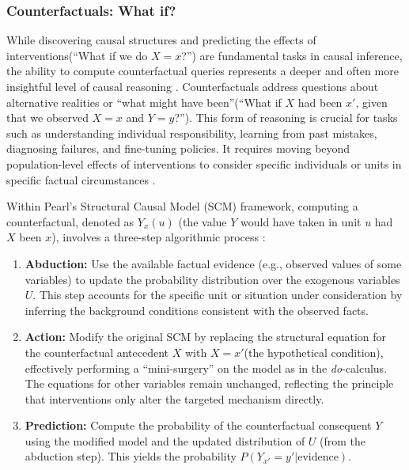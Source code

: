 {\newpage

\subsubsection{Counterfactuals: What if?}
\label{subsec:counterfactuals}

While discovering causal structures and predicting the effects of interventions(``What if we do $X=x$?'') are fundamental tasks in causal inference, the ability to compute counterfactual queries represents a deeper and often more insightful level of causal reasoning \cite{Pearl2009Causality}. Counterfactuals address questions about alternative realities or ``what might have been''(``What if $X$ had been $x'$, given that we observed $X=x$ and $Y=y$?''). This form of reasoning is crucial for tasks such as understanding individual responsibility, learning from past mistakes, diagnosing failures, and fine-tuning policies. It requires moving beyond population-level effects of interventions to consider specific individuals or units in specific factual circumstances \cite{Pearl2009Causality, Balke1994Probabilistic}.

Within Pearl's Structural Causal Model (SCM) framework, computing a counterfactual, denoted as $Y_x(u)$ (the value $Y$ would have taken in unit $u$ had $X$ been $x$), involves a three-step algorithmic process \cite{Pearl2009Causality}:
\begin{enumerate}
    \item \textbf{Abduction:} Use the available factual evidence (e.g., observed values of some variables) to update the probability distribution over the exogenous variables $U$. This step accounts for the specific unit or situation under consideration by inferring the background conditions consistent with the observed facts.
    \item \textbf{Action:} Modify the original SCM by replacing the structural equation for the counterfactual antecedent $X$ with $X=x'$(the hypothetical condition), effectively performing a ``mini-surgery'' on the model as in the \textit{do}-calculus. The equations for other variables remain unchanged, reflecting the principle that interventions only alter the targeted mechanism directly.
    \item \textbf{Prediction:} Compute the probability of the counterfactual consequent $Y$ using the modified model and the updated distribution of $U$ (from the abduction step). This yields the probability $P(Y_{x'} = y' | \text{evidence})$.
\end{enumerate}

}
